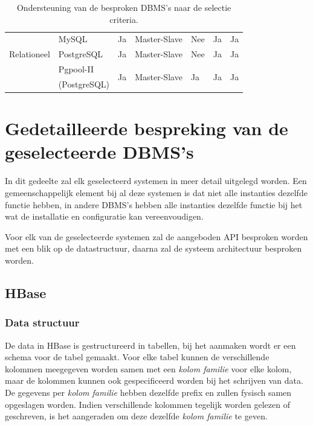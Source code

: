 \begin{table}[htbp]
{\begin{tabular}{ll|lllll}
          \hline
    \multirow{3}[0]{*}{Relationeel} & MySQL & Ja    & Master-Slave & Nee   & Ja    & Ja \\
    	  & PostgreSQL & Ja    & Master-Slave & Nee   & Ja    & Ja \\
          & Pgpool-II & \multicolumn{1}{l}{\multirow{2}[0]{*}{Ja}} & \multicolumn{1}{l}{\multirow{2}[0]{*}{Master-Slave}} & \multicolumn{1}{l}{\multirow{2}[0]{*}{Ja}} & \multicolumn{1}{l}{\multirow{2}[0]{*}{Ja}} & \multicolumn{1}{l}{\multirow{2}[0]{*}{Ja}} \\
          & (PostgreSQL) & \multicolumn{1}{l}{} & \multicolumn{1}{l}{} & \multicolumn{1}{l}{} & \multicolumn{1}{l}{} & \multicolumn{1}{l}{} \\
    \end{tabular}%
    }
    \caption{Ondersteuning van de besproken DBMS's naar de selectie criteria. }
  \label{table:vergelijkingNosql}%
\end{table}%

\section{Gedetailleerde bespreking van de geselecteerde DBMS's}
In dit gedeelte zal elk geselecteerd systemen in meer detail uitgelegd worden. Een gemeenschappelijk element bij al deze systemen is dat niet alle instanties dezelfde functie hebben, in andere DBMS's hebben alle instanties dezelfde functie bij het wat de installatie en configuratie kan vereenvoudigen. 

Voor elk van de geselecteerde systemen zal de aangeboden API besproken worden met een blik op de datastructuur, daarna zal de systeem architectuur besproken worden. 

\subsection{HBase}

\subsubsection{Data structuur\cite{george2011hbase}}
De data in HBase is gestructureerd in tabellen, bij het aanmaken wordt er een schema voor de tabel gemaakt. Voor elke tabel kunnen de verschillende kolommen meegegeven worden samen met een \textit{kolom familie} voor elke kolom, maar de kolommen kunnen ook gespecificeerd worden bij het schrijven van data. De gegevens per \textit{kolom familie} hebben dezelfde prefix en zullen fysisch samen opgeslagen worden. Indien verschillende kolommen tegelijk worden gelezen of geschreven, is het aangeraden om deze dezelfde \textit{kolom familie} te geven. 

